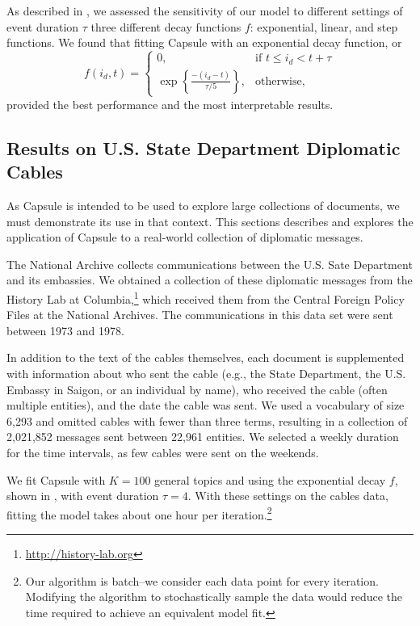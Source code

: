 As described in , we assessed the sensitivity of our model to different settings of event duration $\tau$ three different decay functions $f$: exponential, linear, and step functions.  We found that fitting Capsule with an exponential decay function, or
\begin{equation}
f(i_d, t) = 
\begin{cases}
    0,			& \text{if } t \le i_d < t + \tau\\
    \exp\left\{\frac{-(i_d - t)}{\tau/5}\right\},          & \text{otherwise,}
\end{cases}
\label{eq:f}
\end{equation}
provided the best performance and the most interpretable results.





\subsection{Results on U.S. State Department Diplomatic Cables}

As Capsule is intended to be used to explore large collections of documents, we must demonstrate its use in that context.  This sections describes and explores the application of Capsule to a real-world collection of diplomatic messages.

The National Archive collects communications between the U.S. Sate Department and its embassies.  We obtained a collection of these diplomatic messages from the History Lab at Columbia,\footnote{\url{http://history-lab.org}} which received them from the Central Foreign Policy Files at the National Archives.  The communications in this data set were sent between 1973 and 1978.

In addition to the text of the cables themselves, each document is supplemented with information about who sent the cable (e.g., the State Department, the U.S. Embassy in Saigon, or an individual by name), who received the cable (often multiple entities), and the date the cable was sent.  We used a vocabulary of size 6,293 and omitted cables with fewer than three terms, resulting in a collection of 2,021,852 messages sent between 22,961 entities.  We selected a weekly duration for the time intervals, as few cables were sent on the weekends.

We fit Capsule with $K=100$ general topics and using the exponential decay $f$, shown in , with event duration $\tau=4$.  With these settings on the cables data, fitting the model takes about one hour per iteration.\footnote{Our algorithm is batch--we consider each data point for every iteration.  Modifying the algorithm to stochastically sample the data would reduce the time required to achieve an equivalent model fit.}

